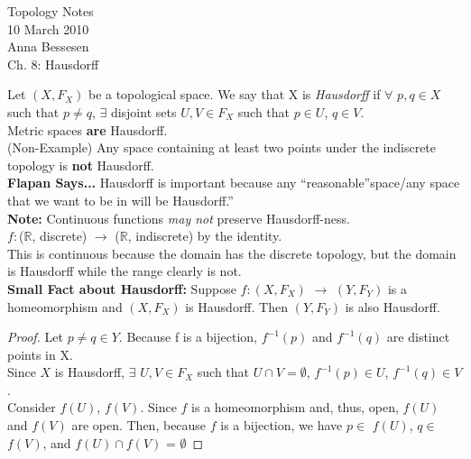 \documentclass[11pt,reqno]{amsart}
\newcommand{\R}[0]{\mathbb{R}}
\theoremstyle{definition}
\begin{document}
    \begin{center}
    \LARGE{Topology Notes} \\
    \vspace{.1in}
    \normalsize{10 March 2010}\\
    \vspace{.1in}
    \normalsize{Anna Bessesen} \\
    \vspace{.2in}
    \Large{Ch. 8: Hausdorff} \\
    \end{center}
    \Definition
    Let $(X, F _X)$ be a topological space. We say that X is \emph{Hausdorff} if $\forall$ $p, q \in X$ such that $p \neq q$, $\exists$ disjoint sets $U, V \in F_X$ such that $p \in U$, $q \in V$. \\
    \Example
    Metric spaces \textbf{are} Hausdorff.\\
    \Example
    (Non-Example)
    Any space containing at least two points under the indiscrete topology is \textbf{not} Hausdorff.\\
    
    \textbf{Flapan Says...} Hausdorff is important because any \textquotedblleft reasonable\textquotedblright space/any space that we want to be in will be Hausdorff.\textquotedblright \\
    
    \textbf{Note:} Continuous functions \emph{may not} preserve Hausdorff-ness.\\
    \Example
    $f$$\colon$($\R$, discrete) $\to$ ($\R$, indiscrete) by the identity.\\
    
    \indent
    This is continuous because the domain has the discrete topology, but the domain is Hausdorff while the range clearly is not.\\
    
    \textbf{Small Fact about Hausdorff:}
    Suppose $f \colon (X, F_X)$ $\to$ $(Y, F_Y)$ is a homeomorphism and $(X, F_X)$ is Hausdorff. Then $(Y, F_Y)$ is also Hausdorff.\\
    
    \begin{proof} Let $p \neq q \in Y$. Because f is a bijection, $f^{-1}(p)$ and $f^{-1}(q)$ are distinct points in X. \\
    \indent
    Since $X$ is Hausdorff, $\exists$ $U, V \in F_X$ such that $U \cap V = \emptyset$, $f^{-1}(p) \in U$, $f^{-1}(q) \in V$. \\
    \indent
    Consider $f(U)$, $f(V)$. Since $f$ is a homeomorphism and, thus, open, $f(U)$ and $f(V)$ are open. Then, because $f$ is a bijection, we have $p \in$ $f(U)$, $q \in$ $f(V)$, and $f(U) \cap f(V)$ = $\emptyset$
    \end{proof}
    
\end{document}

